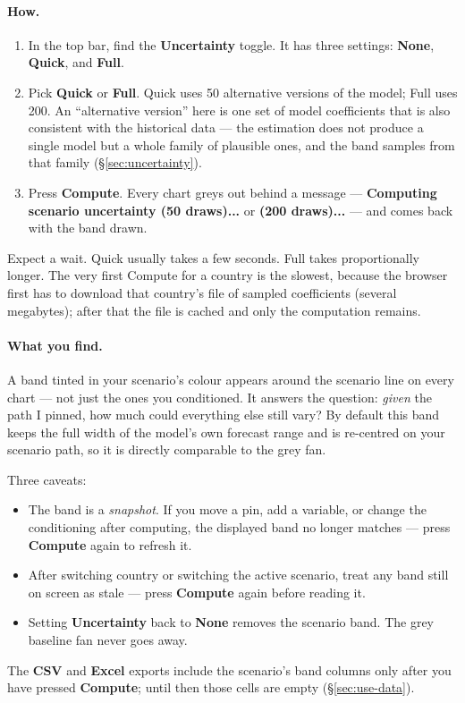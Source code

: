\documentclass[11pt]{article}
\theoremstyle{definition}
\theoremstyle{remark}
\begin{document}
\paragraph{How.}
\begin{enumerate}
  \item In the top bar, find the \textbf{Uncertainty} toggle. It has three settings:
    \textbf{None}, \textbf{Quick}, and \textbf{Full}.
  \item Pick \textbf{Quick} or \textbf{Full}. Quick uses 50 alternative versions of
    the model; Full uses 200. An ``alternative version'' here is one set of model
    coefficients that is also consistent with the historical data --- the estimation
    does not produce a single model but a whole family of plausible ones, and the band
    samples from that family (\S\ref{sec:uncertainty}).
  \item Press \textbf{Compute}. Every chart greys out behind a message ---
    \textbf{Computing scenario uncertainty (50 draws)...} or \textbf{(200 draws)...}
    --- and comes back with the band drawn.
\end{enumerate}
Expect a wait. Quick usually takes a few seconds. Full takes proportionally longer.
The very first Compute for a country is the slowest, because the browser first has to
download that country's file of sampled coefficients (several megabytes); after that
the file is cached and only the computation remains.

\paragraph{What you find.} A band tinted in your scenario's colour appears around the
scenario line on every chart --- not just the ones you conditioned. It answers the
question: \emph{given} the path I pinned, how much could everything else still vary?
By default this band keeps the full width of the model's own forecast range and is
re-centred on your scenario path, so it is directly comparable to the grey fan.

Three caveats:
\begin{itemize}
  \item The band is a \emph{snapshot}. If you move a pin, add a variable, or change
    the conditioning after computing, the displayed band no longer matches --- press
    \textbf{Compute} again to refresh it.
  \item After switching country or switching the active scenario, treat any band still
    on screen as stale --- press \textbf{Compute} again before reading it.
  \item Setting \textbf{Uncertainty} back to \textbf{None} removes the scenario band.
    The grey baseline fan never goes away.
\end{itemize}
The \textbf{CSV} and \textbf{Excel} exports include the scenario's band columns only
after you have pressed \textbf{Compute}; until then those cells are empty
(\S\ref{sec:use-data}).
\end{document}
